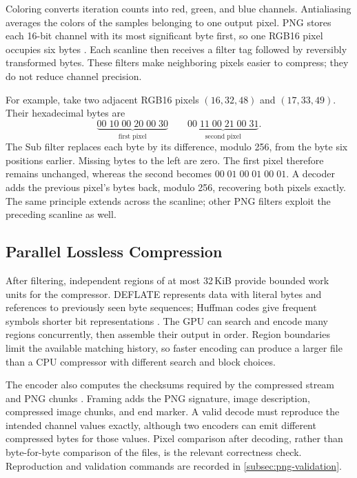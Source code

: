 Coloring converts iteration counts into red, green, and blue channels. Antialiasing averages
the colors of the samples belonging to one output pixel. PNG stores each 16-bit channel with
its most significant byte first, so one RGB16 pixel occupies six bytes
\cite{PNGThirdEdition2025}. Each scanline then
receives a filter tag followed by reversibly transformed bytes. These filters make neighboring
pixels easier to compress; they do not reduce channel precision.

For example, take two adjacent RGB16 pixels $(16,32,48)$ and $(17,33,49)$.
Their hexadecimal bytes are
\[
\underbrace{00\;10\;00\;20\;00\;30}_{\text{first pixel}}
\qquad
\underbrace{00\;11\;00\;21\;00\;31}_{\text{second pixel}}.
\]
The Sub filter replaces each byte by its difference, modulo 256, from the byte six positions
earlier. Missing bytes to the left are zero. The first pixel therefore remains unchanged,
whereas the second becomes $00\;01\;00\;01\;00\;01$. A decoder adds the previous pixel's
bytes back, modulo 256, recovering both pixels exactly. The same principle extends across
the scanline; other PNG filters exploit the preceding scanline as well.

\subsection{Parallel Lossless Compression}

After filtering, independent regions of at most 32\,KiB provide bounded work units for the
compressor. DEFLATE represents data with literal bytes and references to previously seen byte
sequences; Huffman codes give frequent symbols shorter bit representations \cite{RFC1951}.
The GPU can search
and encode many regions concurrently, then assemble their output in order. Region boundaries
limit the available matching history, so faster encoding can produce a larger file than a CPU
compressor with different search and block choices.

The encoder also computes the checksums required by the compressed stream and PNG chunks
\cite{RFC1950,PNGThirdEdition2025}.
Framing adds the PNG signature, image description, compressed image chunks, and end marker.
A valid decode must reproduce the intended channel values exactly, although two encoders can
emit different compressed bytes for those values. Pixel comparison after decoding, rather
than byte-for-byte comparison of the files, is the relevant correctness check. Reproduction
and validation commands are recorded in \cref{subsec:png-validation}.

